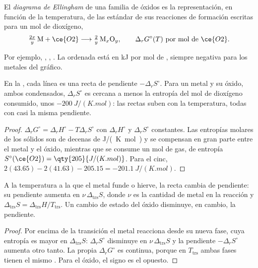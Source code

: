 \begin{definition}\label{def:b2:ellingham:diagram}
El \emph{diagrama de Ellingham} de una familia de óxidos
es la representación, en función de la temperatura, de las  estándar de sus
reacciones de formación escritas para un mol de dioxígeno,
\[
  \tfrac{2x}{y}\,\mathrm M + \ce{O2} \longrightarrow \tfrac{2}{y}\,\mathrm{M}_x\mathrm O_y ,
  \qquad \Delta_r G^\circ(T) \ \text{por mol de } \ce{O2} .
\]
\end{definition}

Por ejemplo, , , . La ordenada está en \unit{kJ} por mol de , siempre negativa para los
metales del gráfico.

\begin{proposition}[Rectas]\label{prop:b2:ellingham:line}
En la , cada línea es una recta de pendiente $-\Delta_r
S^\circ$. Para un metal y su óxido, ambos condensados, $\Delta_r S^\circ$ es
cercana a menos la entropía del mol de dioxígeno consumido, unos
$-\qty{200}{J/(K.mol)}$: las rectas suben con la temperatura, todas con casi la
misma pendiente.
\end{proposition}

\begin{proof}
$\Delta_r G^\circ = \Delta_r H^\circ - T\Delta_r S^\circ$ con $\Delta_r
H^\circ$ y $\Delta_r S^\circ$ constantes. Las entropías molares de los sólidos son de decenas de
\unit{J/(K.mol)} y se compensan en gran parte entre el metal y el óxido, mientras que se consume un mol de
gas, de entropía $S^\circ(\ce{O2}) = \qty{205}{J/(K.mol)}$. Para el cinc,
$2(43.65) - 2(41.63) - 205.15 = \qty{-201.1}{J/(K.mol)}$.
\end{proof}

\begin{proposition}\label{prop:b2:ellingham:break}
A la temperatura a la que el metal funde o hierve, la recta cambia de pendiente:
su pendiente aumenta en $\nu\,\Delta_{\text{trs}}S$, donde $\nu$ es la cantidad de
metal en la reacción y $\Delta_{\text{trs}}S = \Delta_{\text{trs}}H/T_{\text{trs}}$.
Un cambio de estado del óxido disminuye, en cambio, la pendiente.
\end{proposition}

\begin{proof}
Por encima de la transición el metal reacciona desde su nueva fase, cuya entropía es
mayor en $\Delta_{\text{trs}}S$: $\Delta_r S^\circ$ disminuye en $\nu\,\Delta_{\text{trs}}S$
y la pendiente $-\Delta_r S^\circ$ aumenta otro tanto. La propia $\Delta_r G^\circ$
es continua, porque en $T_{\text{trs}}$ ambas fases tienen el mismo
. Para el óxido, el signo es el opuesto.
\end{proof}

